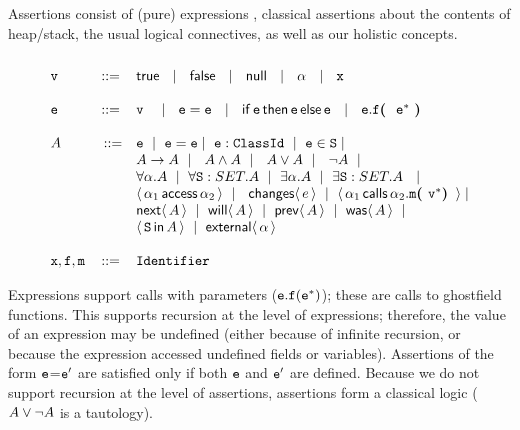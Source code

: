 \begin{definition}[Assertions]  Assertions consist of (pure) expressions \e, classical assertions about the contents of heap/stack, the usual logical  connectives, as well as our holistic concepts.
\label{def:assertions}
 \[
 \begin{array}{lcl}
  ~  \\
 \prg{v}  &\BBC&    \kwN{true}   ~\SOR~  \kwN{false}   ~\SOR~  \kwN{null}  ~\SOR~  \alpha ~\SOR~ \prg{x} \\
  ~  \\
 \SE  &\BBC&    \prg{v}\ ~\SOR~ \SE=\SE    ~\SOR~ \kwN{if}\, \SE\,   \kwN{then}\,  \SE\,    \kwN{else}\, \SE    ~\SOR~  \SE.\f\lp\ \SE^* \ \rp\\
     \\
 \A &\ \BBC   &   \SE \   \mid \  \SE=\SE  \mid \   \SE:\prg{ClassId}  \ \mid \
    \SE\in\prg{S}   \mid  \  \\
    &
  &  \A \rightarrow \A  \ \mid\  \     \A \wedge \A  \ \mid\  \  \A \vee \A  \ \mid\  \ \neg A   \ \mid \ \\
  & &  \forall \alpha.\A  \ \mid \  \forall \prg{S}:SET.\A  \ \mid  \  \exists \alpha.\A  \ \mid \  \exists \prg{S}:SET.\A  \  \ \mid \\
 &    &  \CanAccess {\alpha_1} {\alpha_2} \ \mid\  \ \Changes e 
           \ \mid\  \Calls {\alpha_1}  {\prg{m}} {\alpha_2}  {\prg{v}^*}\mid\\          
&    &  \Next \A  \ \mid \   \Future \A \ \mid \  \Prev \A   \ \mid \ \Past \A \ \mid \\  
 &    &        \Using \SF  \A  \ \mid \  \External \alpha\\
 \\
 \x, \f, \m &\BBC&  \prg{Identifier}  ~ \\
\end{array}
\]
\end{definition}
 
Expressions support calls with parameters  (${\mbox{\tt{e}}}.{\mbox{\tt{f}}}({\mbox{\tt{e}}}^*)$); these are calls to ghostfield
functions. This  supports recursion at the level of expressions; therefore, the value of  an expression  may be
undefined (either because of infinite recursion, or because the expression accessed undefined fields or variables). 
Assertions of the form   ${\mbox{\tt{e}}}$=${\mbox{\tt{e}}}'$ are satisfied only if both ${\mbox{\tt{e}}}$ and ${\mbox{\tt{e}}}'$ are defined. Because we do not support 
recursion at the level of assertions, assertions form a classical logic (\eg $A \vee \neg A$ is a tautology).
 

